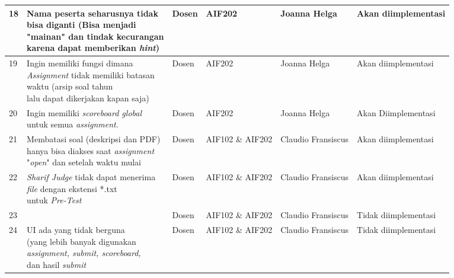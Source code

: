 \begin{table}[H]
{\begin{tabular}{|l|l|l|l|l|l|}
		18 & \makecell[l]{Nama peserta seharusnya tidak \\ bisa diganti (Bisa menjadi \\ "mainan" dan tindak kecurangan \\ karena dapat memberikan \textit{hint})} & Dosen & AIF202 & Joanna Helga & Akan diimplementasi\\ \hline
		19 & \makecell[l]{Ingin memiliki fungsi dimana \\ \textit{Assignment} tidak memiliki batasan \\ waktu (arsip soal tahun \\ lalu dapat dikerjakan kapan saja)} & Dosen & AIF202 & Joanna Helga & Akan diimplementasi\\ \hline
		20 & \makecell[l]{Ingin memiliki \textit{scoreboard global} \\ untuk semua \textit{assignment}.} & Dosen & AIF202 & Joanna Helga & Akan Diimplementasi\\ \hline
		21 & \makecell[l]{Membatasi soal (deskripsi dan PDF) \\ hanya bisa diakses saat \textit{assignment} \\ "\textit{open}" dan setelah waktu mulai} & Dosen & AIF102 \& AIF202 & Claudio Fransiscus & Akan diimplementasi\\ \hline
		22 & \makecell[l]{\textit{Sharif Judge} tidak dapat menerima \\ \textit{file} dengan ekstensi *.txt \\ untuk \textit{Pre-Test}} & Dosen & AIF102 \& AIF202 & Claudio Fransiscus & Akan diimplementasi\\ \hline
		23 & \makecell[l]{UI masih merepotkan} & Dosen & AIF102 \& AIF202 & Claudio Fransiscus & Tidak diimplementasi\\ \hline
		24 & \makecell[l]{UI ada yang tidak berguna \\ (yang lebih banyak digunakan \\ \textit{assignment, submit, scoreboard,} \\ dan hasil \textit{submit}} & Dosen & AIF102 \& AIF202 & Claudio Fransiscus & Tidak diimplementasi\\

		\hline
		
	\end{tabular}}
\end{table}

